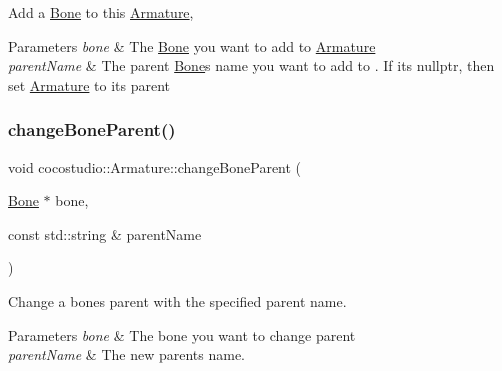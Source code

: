 Add a \hyperlink{classcocostudio_1_1Bone}{Bone} to this \hyperlink{classcocostudio_1_1Armature}{Armature},


\begin{DoxyParams}{Parameters}
{\em bone} & The \hyperlink{classcocostudio_1_1Bone}{Bone} you want to add to \hyperlink{classcocostudio_1_1Armature}{Armature} \\
\hline
{\em parent\+Name} & The parent \hyperlink{classcocostudio_1_1Bone}{Bone}\textquotesingle{}s name you want to add to . If it\textquotesingle{}s nullptr, then set \hyperlink{classcocostudio_1_1Armature}{Armature} to its parent \\
\hline
\end{DoxyParams}
\mbox{\label{classcocostudio_1_1Armature_a993a948ec75aa9ebb41918babe51dc61}} 
\subsubsection{\texorpdfstring{change\+Bone\+Parent()}{changeBoneParent()}\hspace{0.1cm}{\footnotesize\ttfamily [1/2]}}
{\footnotesize\ttfamily void cocostudio\+::\+Armature\+::change\+Bone\+Parent (\begin{DoxyParamCaption}\item[{\hyperlink{classcocostudio_1_1Bone}{Bone} $\ast$}]{bone,  }\item[{const std\+::string \&}]{parent\+Name }\end{DoxyParamCaption})\hspace{0.3cm}{\ttfamily [virtual]}}

Change a bone\textquotesingle{}s parent with the specified parent name.


\begin{DoxyParams}{Parameters}
{\em bone} & The bone you want to change parent \\
\hline
{\em parent\+Name} & The new parent\textquotesingle{}s name. \\
\hline
\end{DoxyParams}
\mbox{\label{classcocostudio_1_1Armature_a5f1f9869b893c204e02a8c451f4a1067}} 
